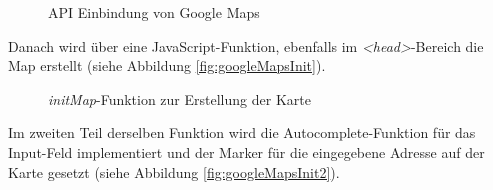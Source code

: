 \begin{figure}[!hp]
	\caption{API Einbindung von Google Maps}
	\label{fig:googleMapsAPI}
\end{figure}

Danach wird über eine JavaScript-Funktion, ebenfalls im \textit{<head>}-Bereich die Map erstellt (siehe Abbildung \vref{fig:googleMapsInit}).

\begin{figure}[!h]
	\caption{\textit{initMap}-Funktion zur Erstellung der Karte}
	\label{fig:googleMapsInit}
\end{figure}

Im zweiten Teil derselben Funktion wird die Autocomplete-Funktion für das Input-Feld implementiert und der Marker für die eingegebene Adresse auf der Karte gesetzt (siehe Abbildung \vref{fig:googleMapsInit2}).

